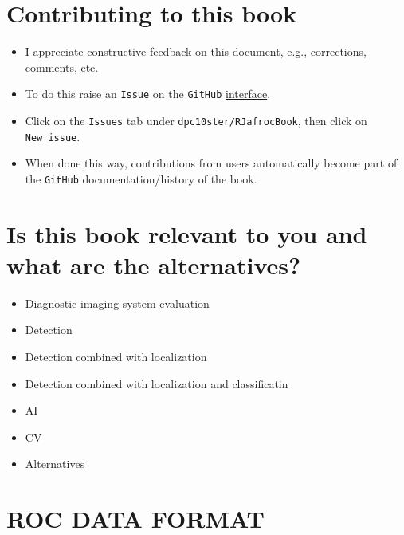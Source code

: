 \documentclass[
]{book}
\providecommand{\tightlist}{%
  \setlength{\itemsep}{0pt}\setlength{\parskip}{0pt}}
\begin{document}
\hypertarget{contributing-to-this-book}{%
\chapter*{Contributing to this book}\label{contributing-to-this-book}}

\begin{itemize}
\tightlist
\item
  I appreciate constructive feedback on this document, e.g., corrections, comments, etc.\\
\item
  To do this raise an \texttt{Issue} on the \texttt{GitHub} \href{https://github.com/dpc10ster/RJafrocBook}{interface}.
\item
  Click on the \texttt{Issues} tab under \texttt{dpc10ster/RJafrocBook}, then click on \texttt{New\ issue}.
\item
  When done this way, contributions from users automatically become part of the \texttt{GitHub} documentation/history of the book.
\end{itemize}

\hypertarget{is-this-book-relevant-to-you-and-what-are-the-alternatives}{%
\chapter*{Is this book relevant to you and what are the alternatives?}\label{is-this-book-relevant-to-you-and-what-are-the-alternatives}}

\begin{itemize}
\tightlist
\item
  Diagnostic imaging system evaluation
\item
  Detection
\item
  Detection combined with localization
\item
  Detection combined with localization and classificatin
\item
  AI
\item
  CV
\item
  Alternatives
\end{itemize}

\hypertarget{rocdataformat}{%
\chapter{ROC DATA FORMAT}\label{rocdataformat}}
\end{document}
